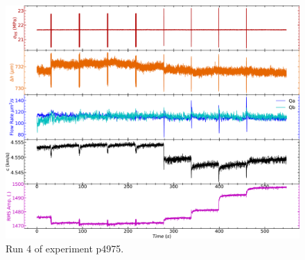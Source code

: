 \begin{figure}[ht]
	\centering
	\includegraphics[width=1\columnwidth]{NS_p4975_run4}
	\caption{Run 4 of experiment p4975.}
	\label{fig:run4_p4975}
\end{figure}

\newpage



